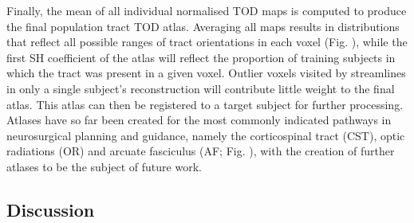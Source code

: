 Finally, the mean of all individual normalised TOD maps is computed to produce the final population tract TOD atlas.
Averaging all maps results in distributions that reflect all possible ranges of tract orientations in each voxel (Fig. ), while the first SH coefficient of the atlas will reflect the proportion of training subjects in which the tract was present in a given voxel.
Outlier voxels visited by streamlines in only a single subject's reconstruction will contribute little weight to the final atlas.
This atlas can then be registered to a target subject for further processing.
Atlases have so far been created for the most commonly indicated pathways in neurosurgical planning and guidance, namely the corticospinal tract (CST), optic radiations (OR) and arcuate fasciculus (AF; Fig. ), with the creation of further atlases to be the subject of future work.

\subsection{Discussion}

